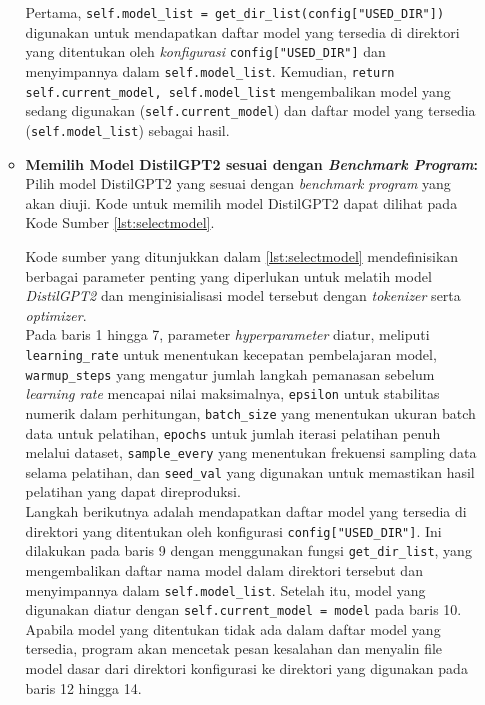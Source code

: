 \begin{enumerate}[topsep=0pt]
\begin{itemize}
      Pertama, \texttt{self.model\_list = get\_dir\_list(config["USED\_DIR"])} digunakan untuk mendapatkan daftar model yang tersedia di direktori yang ditentukan oleh \emph{konfigurasi} \texttt{config["USED\_DIR"]} dan menyimpannya dalam \texttt{self.model\_list}. Kemudian, \texttt{return self.current\_model, self.model\_list} mengembalikan model yang sedang digunakan (\texttt{self.current\_model}) dan daftar model yang tersedia (\texttt{self.model\_list}) sebagai hasil.

      \item \textbf{Memilih Model DistilGPT2 sesuai dengan \emph{Benchmark Program}:} Pilih model DistilGPT2 yang sesuai dengan \emph{benchmark program} yang akan diuji.
      Kode untuk memilih model DistilGPT2 dapat dilihat pada Kode Sumber \ref{lst:selectmodel}.

      

      Kode sumber yang ditunjukkan dalam \ref{lst:selectmodel} mendefinisikan berbagai parameter penting yang diperlukan untuk melatih model \emph{DistilGPT2} dan menginisialisasi model tersebut dengan \emph{tokenizer} serta \emph{optimizer}. 
      \\

      Pada baris 1 hingga 7, parameter \emph{hyperparameter} diatur, meliputi \texttt{learning\_rate} untuk menentukan kecepatan pembelajaran model, \texttt{warmup\_steps} yang mengatur jumlah langkah pemanasan sebelum \emph{learning rate} mencapai nilai maksimalnya, \texttt{epsilon} untuk stabilitas numerik dalam perhitungan, \texttt{batch\_size} yang menentukan ukuran batch data untuk pelatihan, \texttt{epochs} untuk jumlah iterasi pelatihan penuh melalui dataset, \texttt{sample\_every} yang menentukan frekuensi sampling data selama pelatihan, dan \texttt{seed\_val} yang digunakan untuk memastikan hasil pelatihan yang dapat direproduksi.
      \\

      Langkah berikutnya adalah mendapatkan daftar model yang tersedia di direktori yang ditentukan oleh konfigurasi \texttt{config["USED\_DIR"]}. Ini dilakukan pada baris 9 dengan menggunakan fungsi \texttt{get\_dir\_list}, yang mengembalikan daftar nama model dalam direktori tersebut dan menyimpannya dalam \texttt{self.model\_list}. Setelah itu, model yang digunakan diatur dengan \texttt{self.current\_model = model} pada baris 10. Apabila model yang ditentukan tidak ada dalam daftar model yang tersedia, program akan mencetak pesan kesalahan dan menyalin file model dasar dari direktori konfigurasi ke direktori yang digunakan pada baris 12 hingga 14.
      \\


\end{itemize}
\end{enumerate}
